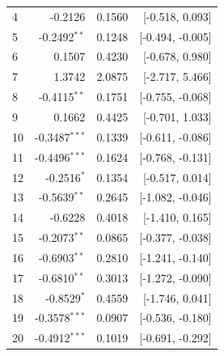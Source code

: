 \begin{longtable}{lrrr}
4 & -0.2126 & 0.1560 & [-0.518, 0.093] \\
5 & -0.2492$^{**}$ & 0.1248 & [-0.494, -0.005] \\
6 & 0.1507 & 0.4230 & [-0.678, 0.980] \\
7 & 1.3742 & 2.0875 & [-2.717, 5.466] \\
8 & -0.4115$^{**}$ & 0.1751 & [-0.755, -0.068] \\
9 & 0.1662 & 0.4425 & [-0.701, 1.033] \\
10 & -0.3487$^{***}$ & 0.1339 & [-0.611, -0.086] \\
11 & -0.4496$^{***}$ & 0.1624 & [-0.768, -0.131] \\
12 & -0.2516$^{*}$ & 0.1354 & [-0.517, 0.014] \\
13 & -0.5639$^{**}$ & 0.2645 & [-1.082, -0.046] \\
14 & -0.6228 & 0.4018 & [-1.410, 0.165] \\
15 & -0.2073$^{**}$ & 0.0865 & [-0.377, -0.038] \\
16 & -0.6903$^{**}$ & 0.2810 & [-1.241, -0.140] \\
17 & -0.6810$^{**}$ & 0.3013 & [-1.272, -0.090] \\
18 & -0.8529$^{*}$ & 0.4559 & [-1.746, 0.041] \\
19 & -0.3578$^{***}$ & 0.0907 & [-0.536, -0.180] \\
20 & -0.4912$^{***}$ & 0.1019 & [-0.691, -0.292] \\
\end{longtable}
